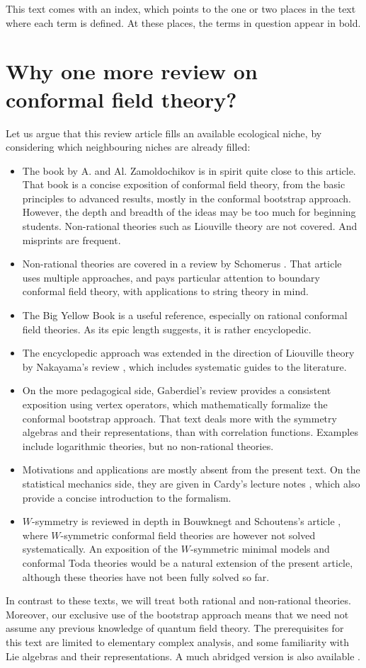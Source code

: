 \documentclass[12pt, a4paper, notitlepage, twoside]{report}
\numberwithin{equation}{section}
\theoremstyle{break}
\begin{document}
This text comes with an index, which points to the one or two places in the text where each term is defined.
At these places, the terms in question appear in bold. 


\section{Why one more review on conformal field theory?}

Let us argue that this review article fills an available ecological niche, by considering which neighbouring niches are already filled: 
\begin{itemize}
\item 
The book \cite{zz90} by A. and Al. Zamoldochikov is in spirit quite close to this article.
That book is a concise exposition of conformal field theory, from the basic principles to advanced results, mostly in the conformal bootstrap approach.
However, the depth and breadth of the ideas may be too much for beginning students.
Non-rational theories such as Liouville theory are not covered.
And misprints are frequent.
\item
Non-rational theories are covered in a review by Schomerus \cite{sch05}.
That article uses multiple approaches, and pays particular attention to boundary conformal field theory, with applications to string theory in mind. 
\item
The Big Yellow Book \cite{fms97} is a useful reference, especially on rational conformal field theories.
As its epic length suggests, it is rather encyclopedic. 
\item
The encyclopedic approach was extended in the direction of Liouville theory by Nakayama's review \cite{nak04}, which includes systematic guides to the literature.
\item 
On the more pedagogical side, Gaberdiel's review \cite{gab99} provides a consistent exposition using vertex operators, which mathematically formalize the conformal bootstrap approach.
That text deals more with the symmetry algebras and their representations, than with correlation functions.
Examples include logarithmic theories, but no non-rational theories.
\item
Motivations and applications are mostly absent from the present text.
On the statistical mechanics side, they are given in Cardy's lecture notes \cite{car08}, which also provide a concise introduction to the formalism.
\item 
$W$-symmetry is reviewed in depth in Bouwknegt and Schoutens's article \cite{bs92}, where $W$-symmetric conformal field theories are however not solved systematically.
An exposition of the $W$-symmetric minimal models and conformal Toda theories would be a natural extension of the present article, although these theories have not been fully solved so far. 
\end{itemize}
In contrast to these texts, we will treat both rational and non-rational theories.
Moreover, our exclusive use of the bootstrap approach means that we need not assume any previous knowledge of quantum field theory.
The prerequisites for this text are limited to 
elementary complex analysis, and some familiarity with Lie algebras and their representations.
A much abridged version is also available \cite{rib16}.
\end{document}
